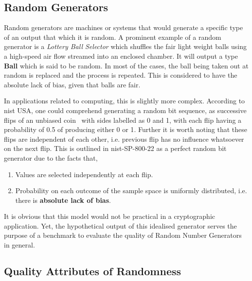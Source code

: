 \subsection{Random Generators}

Random generators are machines or systems that would generate a specific type of an output that which it is random. A prominent example of a random generator is a \textit{Lottery Ball Selector} which shuffles the fair light weight balls using a high-speed air flow streamed into an enclosed chamber. It will output a type \textbf{Ball} which is said to be random. In most of the cases, the ball being taken out at random is replaced and the process is repeated. This is considered to have the absolute lack of bias, given that balls are fair.

In applications related to computing, this is slightly more complex. According to \acrfull{nist} USA, one could comprehend generating a random bit sequence, as successive flips of an unbiased coin \, with sides labelled as 0 and 1, with each flip having a probability of 0.5 of producing either 0 or 1\cite{rep_nist_sp_80022}. Further it is worth noting that these flips are independent of each other, i.e. previous flip has no influence whatsoever on the next flip. This is outlined in \acrshort{nist}-SP-800-22 as a perfect random bit generator due to the facts that,

\begin{enumerate}
    \item Values are selected independently at each flip.
    \item Probability on each outcome of the sample space is uniformly distributed, i.e. there is \textbf{absolute lack of bias}. 
\end{enumerate}

It is obvious that this model would not be practical in a cryptographic application. Yet, the hypothetical output of this idealised generator serves the purpose of a benchmark to evaluate the quality of Random Number Generators in general.

\subsection{Quality Attributes of Randomness}

